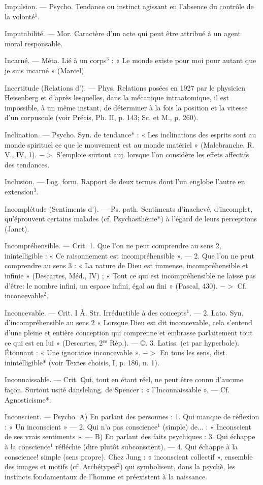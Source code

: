 Impulsion. — Psycho. Tendance ou
instinct agissant en l'absence du
contrôle de la volonté$^1$.

Imputabilité. — Mor. Caractère d’un
acte qui peut être attribué à un
agent moral responsable.

Incarné. — Méta. Lié à un corps$^3$ :
« Le monde existe pour moi pour
autant que je suis incarné » (Marcel).

Incertitude (Relations d'). — Phys.
Relations posées en 1927 par le
physicien Heisenberg et d’après
lesquelles, dans la mécanique intraatomique, il est impossible, à un
même instant, de déterminer à la
fois la position et la vitesse d’un
corpuscule (voir Précis, Ph. II,
p. 143; Sc. et M., p. 260).

Inclination. — Psycho. Syn. de tendance* : « Les inclinations des esprits
sont au monde spirituel ce que le
mouvement est au monde matériel »
(Malebranche, R. V., IV, 1). $->$
S'emploie surtout auj. lorsque l’on
considère les effets affectifs des tendances.

Inclusion. — Log. form. Rapport de
deux termes dont l’un englobe
l’autre en extension$^3$.

Incomplétude (Sentiments d’). — Ps. path. Sentiments d’inachevé, d'incomplet, qu'éprouvent certains malades (cf. Psychasthénie*) à l'égard
de leurs perceptions (Janet).

Incompréhensible. — Crit. 1. Que
l’on ne peut comprendre au sens 2,
inintelligible : « Ce raisonnement est
incompréhensible ». — 2. Que l’on
ne peut comprendre au sens 3 : « La
nature de Dieu est immense, incompréhensible et infinie » (Descartes,
Méd., IV) ; « Tout ce qui est
incompréhensible ne laisse pas d’être:
le nombre infini, un espace infini,
égal au fini » (Pascal, 430). $->$
Cf. inconcevable$^2$.

Inconcevable. — Crit. I À. Str. Irréductible à des concepts$^1$. — 2. Lato.
Syn. d'incompréhensible au sens 2
« Lorsque Dieu est dit inconcevable,
cela s'entend d’une pleine et entière
conception qui comprenne et embrasse parlaitement tout ce qui est
en lui » (Descartes, 2$^\text{es}$ Rép.). —
©. 3. Latiss. (et par hyperbole).
Étonnant : « Une ignorance inconcevable ». $->$ En tous les sens, dist.
inintelligible* (voir Textes choisis,
I, p. 186, n. 1).

Inconnaissable. — Crit. Qui, tout en
étant réel, ne peut être connu d’aucune façon. Surtout usité danslelang.
de Spencer : « l’Inconnaissable ». —
Cf. Agnosticisme*.

Inconscient. — Psycho. A) En parlant
des personnes : 1. Qui manque de
réflexion : « Un inconscient » —
2. Qui n’a pas conscience$^1$ (simple)
de... : « Inconscient de ses vrais
sentiments ». — B) En parlant des
faits psychiques : 3. Qui échappe à
la conscience$^1$ réfléchie (dire plutôt
subconscient). — 4. Qui échappe à
la conscience! simple (sens propre).
Chez Jung : « inconscient collectif »,
ensemble des images et motifs (cf.
Archétypes$^2$) qui symbolisent, dans
la psychè, les instincts fondamentaux de l’homme et préexistent à la
naissance.

